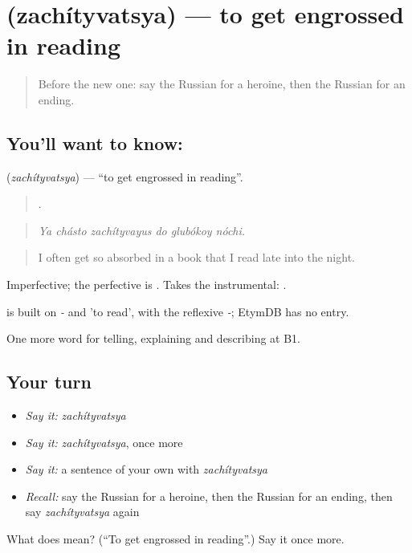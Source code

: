 \section[\texorpdfstring{\ru{зачитываться} (zachítyvatsya)}{зачитываться (zachítyvatsya)}]{ (zachítyvatsya) — to get engrossed in reading}

\label{lesson:RU-C523-zachityvatsya}



\begin{quote}
Before the new one: say the Russian for a heroine, then the Russian for an ending.
\end{quote}

\subsection*{You'll want to know: }
\textbf{} (\emph{zachítyvatsya}) — \textquotedblleft{}to get engrossed in reading\textquotedblright{}.

\begin{quote}
     .
\end{quote}

\begin{quote}
\emph{Ya chásto zachítyvayus do glubókoy nóchi.}
\end{quote}

\begin{quote}
I often get so absorbed in a book that I read late into the night.
\end{quote}

Imperfective; the perfective is . Takes the instrumental: \emph{ }.

\begin{cousinweb}
\emph{} is built on \emph{-} and \emph{} 'to read', with the reflexive \emph{-}; EtymDB has no entry.
\end{cousinweb}

\begin{grammarlens}[title={What you've built}]
One more word for telling, explaining and describing at B1.
\end{grammarlens}

\subsection*{Your turn}
\begin{itemize}
\raggedright
  \item \emph{Say it:} \emph{zachítyvatsya}
  \item \emph{Say it:} \emph{zachítyvatsya}, once more
  \item \emph{Say it:} a sentence of your own with \emph{zachítyvatsya}
  \item \emph{Recall:} say the Russian for a heroine, then the Russian for an ending, then say \emph{zachítyvatsya} again
\end{itemize}

\begin{tcolorbox}[breakable,colback=teal!4,colframe=teal!35!black,title={Before you move on}]
What does  mean? (\textquotedblleft{}To get engrossed in reading\textquotedblright{}.) Say it once more.
\end{tcolorbox}

